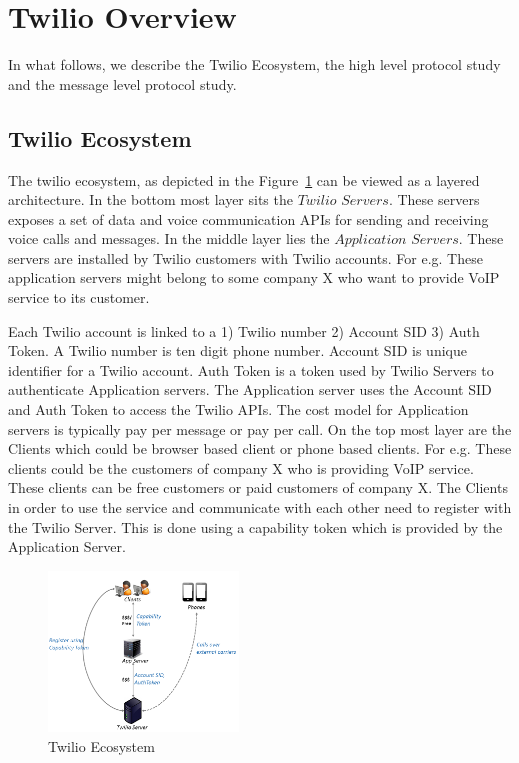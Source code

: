 \section{Twilio Overview}
\label{sec-twilioecoandprotocolstudy}
In what follows, we describe the Twilio Ecosystem, the high level protocol study and the message level protocol study.
\subsection{Twilio Ecosystem}
\label{subsec-twilioeco}
The twilio ecosystem, as depicted in the Figure~\ref{fig:ecosystem} can be viewed as a layered architecture. In the bottom most layer sits the $Twilio$  $Servers$. These servers exposes a set of data and voice communication APIs for sending and receiving voice calls and messages. In the middle layer lies the $Application$ $Servers$. These servers are installed by Twilio customers with Twilio accounts. For e.g. These application servers might belong to some company X who want to provide VoIP service to its customer.  

Each Twilio account is linked to a 1) Twilio number 2) Account SID 3) Auth Token. A Twilio number is ten digit phone number. Account SID is unique identifier for a Twilio account. Auth Token is a token used by Twilio Servers to authenticate Application servers. The Application server uses the Account SID and Auth Token to access the Twilio APIs. The cost model for Application servers is typically pay per message or pay per call. On the top most layer are the Clients which could be browser based client or phone based clients. For e.g. These clients could be the customers of company X who is providing VoIP service. These clients can be free customers or paid customers of company X. The Clients in order to use the service and communicate with each other need to register with the Twilio Server. This is done using a capability token which is provided by the Application Server. 
\begin{figure}
\centering
  \centering
  \includegraphics[width=0.45\textwidth]{figs/Ecosystem.png}
\caption{Twilio Ecosystem}
\label{fig:ecosystem}
\end{figure}     

